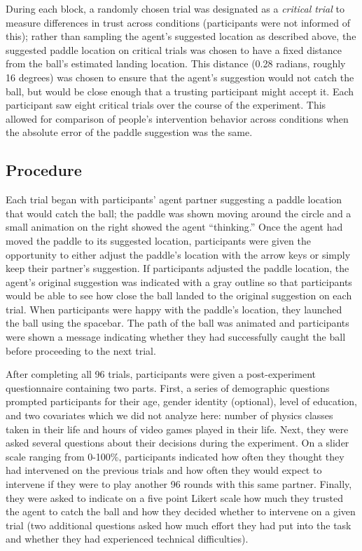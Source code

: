 \documentclass[10pt,letterpaper]{article}
\begin{document}
During each block, a randomly chosen trial was designated as a \textit{critical trial} to measure differences in trust across conditions (participants were not informed of this); rather than sampling the agent's suggested location as described above, the suggested paddle location on critical trials was chosen to have a fixed distance from the ball's estimated landing location. This distance (0.28 radians, roughly 16 degrees) was chosen to ensure that the agent's suggestion would not catch the ball, but would be close enough that a trusting participant might accept it. Each participant saw eight critical trials over the course of the experiment. This allowed for comparison of people's intervention behavior across conditions when the absolute error of the paddle suggestion was the same. 


\subsection{Procedure}
Each trial began with participants' agent partner suggesting a paddle location that would catch the ball; the paddle was shown moving around the circle and a small animation on the right showed the agent ``thinking.'' Once the agent had moved the paddle to its suggested location, participants were given the opportunity to either adjust the paddle's location with the arrow keys or simply keep their partner's suggestion. If participants adjusted the paddle location, the agent's original suggestion was indicated with a gray outline so that participants would be able to see how close the ball landed to the original suggestion on each trial. When participants were happy with the paddle's location, they launched the ball using the spacebar. The path of the ball was animated and participants were shown a message indicating whether they had successfully caught the ball before proceeding to the next trial. 

After completing all 96 trials, participants were given a post-experiment questionnaire containing two parts. First, a series of demographic questions prompted participants for their age, gender identity (optional), level of education, and two covariates which we did not analyze here: number of physics classes taken in their life and hours of video games played in their life. Next, they were asked several questions about their decisions during the experiment. On a slider scale ranging from 0-100\%, participants indicated how often they thought they had intervened on the previous trials and how often they would expect to intervene if they were to play another 96 rounds with this same partner. Finally, they were asked to indicate on a five point Likert scale how much they trusted the agent to catch the ball and how they decided whether to intervene on a given trial (two additional questions asked how much effort they had put into the task and whether they had experienced technical difficulties).
\end{document}

